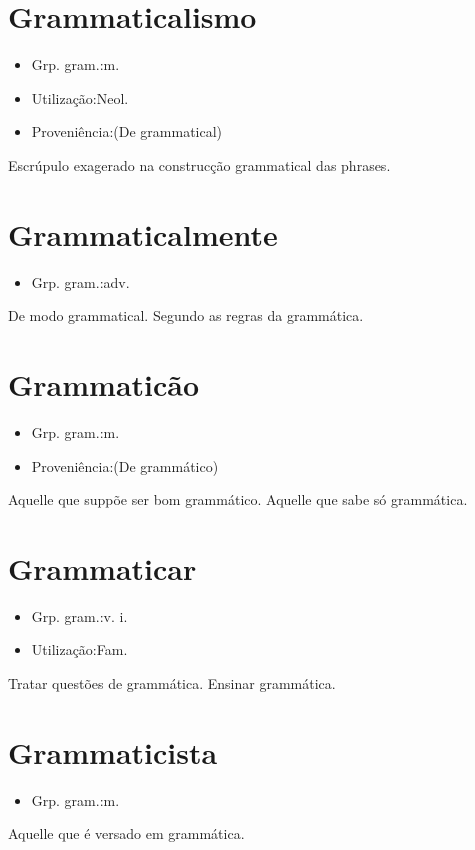 \section{Grammaticalismo}
\begin{itemize}
\item {Grp. gram.:m.}
\end{itemize}
\begin{itemize}
\item {Utilização:Neol.}
\end{itemize}
\begin{itemize}
\item {Proveniência:(De \textunderscore grammatical\textunderscore )}
\end{itemize}
Escrúpulo exagerado na construcção grammatical das phrases.
\section{Grammaticalmente}
\begin{itemize}
\item {Grp. gram.:adv.}
\end{itemize}
De modo grammatical.
Segundo as regras da grammática.
\section{Grammaticão}
\begin{itemize}
\item {Grp. gram.:m.}
\end{itemize}
\begin{itemize}
\item {Proveniência:(De \textunderscore grammático\textunderscore )}
\end{itemize}
Aquelle que suppõe ser bom grammático.
Aquelle que sabe só grammática.
\section{Grammaticar}
\begin{itemize}
\item {Grp. gram.:v. i.}
\end{itemize}
\begin{itemize}
\item {Utilização:Fam.}
\end{itemize}
Tratar questões de grammática.
Ensinar grammática.
\section{Grammaticista}
\begin{itemize}
\item {Grp. gram.:m.}
\end{itemize}
Aquelle que é versado em grammática.
